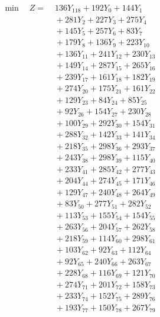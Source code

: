 \documentclass[a4paper,10pt]{article}
\begin{document}
\allowdisplaybreaks
{\small
\begin{align}
\min \quad Z = &\; 136 Y_{118} + 192 Y_{0} + 144 Y_{1} \\[0.3ex]
&\;  + 281 Y_{2} + 227 Y_{3} + 275 Y_{4} \\[0.3ex]
&\;  + 145 Y_{5} + 257 Y_{6} + 83 Y_{7} \\[0.3ex]
&\;  + 179 Y_{8} + 136 Y_{9} + 223 Y_{10} \\[0.3ex]
&\;  + 136 Y_{11} + 241 Y_{12} + 230 Y_{13} \\[0.3ex]
&\;  + 149 Y_{14} + 287 Y_{15} + 265 Y_{16} \\[0.3ex]
&\;  + 239 Y_{17} + 161 Y_{18} + 182 Y_{19} \\[0.3ex]
&\;  + 274 Y_{20} + 175 Y_{21} + 161 Y_{22} \\[0.3ex]
&\;  + 129 Y_{23} + 84 Y_{24} + 85 Y_{25} \\[0.3ex]
&\;  + 92 Y_{26} + 154 Y_{27} + 230 Y_{28} \\[0.5ex]\allowbreak
&\;  + 100 Y_{29} + 292 Y_{30} + 154 Y_{31} \\[0.3ex]
&\;  + 288 Y_{32} + 142 Y_{33} + 141 Y_{34} \\[0.3ex]
&\;  + 218 Y_{35} + 298 Y_{36} + 293 Y_{37} \\[0.3ex]
&\;  + 243 Y_{38} + 298 Y_{39} + 115 Y_{40} \\[0.3ex]
&\;  + 233 Y_{41} + 285 Y_{42} + 277 Y_{43} \\[0.3ex]
&\;  + 204 Y_{44} + 274 Y_{45} + 171 Y_{46} \\[0.3ex]
&\;  + 129 Y_{47} + 240 Y_{48} + 264 Y_{49} \\[0.3ex]
&\;  + 83 Y_{50} + 277 Y_{51} + 282 Y_{52} \\[0.3ex]
&\;  + 113 Y_{53} + 155 Y_{54} + 154 Y_{55} \\[0.3ex]
&\;  + 263 Y_{56} + 204 Y_{57} + 262 Y_{58} \\[0.5ex]\allowbreak
&\;  + 218 Y_{59} + 114 Y_{60} + 298 Y_{61} \\[0.3ex]
&\;  + 103 Y_{62} + 92 Y_{63} + 112 Y_{64} \\[0.3ex]
&\;  + 92 Y_{65} + 240 Y_{66} + 263 Y_{67} \\[0.3ex]
&\;  + 228 Y_{68} + 116 Y_{69} + 121 Y_{70} \\[0.3ex]
&\;  + 274 Y_{71} + 201 Y_{72} + 158 Y_{73} \\[0.3ex]
&\;  + 233 Y_{74} + 152 Y_{75} + 289 Y_{76} \\[0.3ex]
&\;  + 193 Y_{77} + 150 Y_{78} + 267 Y_{79} \\[0.3ex]

\end{align}}
\end{document}
